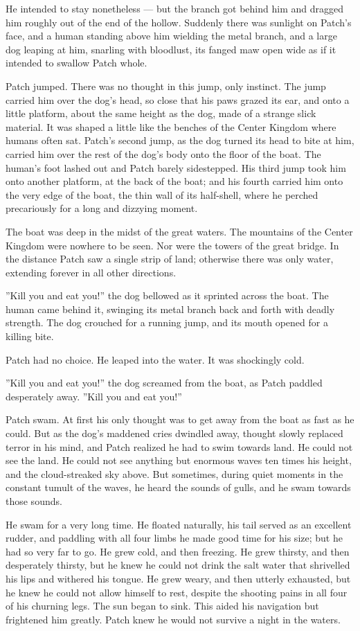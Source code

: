 \documentclass[12pt]{book}
\begin{document}
He intended to stay nonetheless ---
but the branch got behind him and dragged him roughly out of the end of the hollow. Suddenly there was sunlight on Patch's face, and a human standing above him wielding the metal branch, and a large dog leaping at him, snarling with bloodlust, its fanged maw open wide as if it intended to swallow Patch whole.

Patch jumped. There was no thought in this jump, only instinct. The jump carried him over the dog's head, so close that his paws grazed its ear, and onto a little platform, about the same height as the dog, made of a strange slick material. It was shaped a little like the benches of the Center Kingdom where humans often sat. Patch's second jump, as the dog turned its head to bite at him, carried him over the rest of the dog's body onto the floor of the boat. The human's foot lashed out and Patch barely sidestepped. His third jump took him onto another platform, at the back of the boat; and his fourth carried him onto the very edge of the boat, the thin wall of its half-shell, where he perched precariously for a long and dizzying moment.

The boat was deep in the midst of the great waters. The mountains of the Center Kingdom were nowhere to be seen. Nor were the towers of the great bridge. In the distance Patch saw a single strip of land; otherwise there was only water, extending forever in all other directions.

''Kill you and eat you!'' the dog bellowed as it sprinted across the boat. The human came behind it, swinging its metal branch back and forth with deadly strength. The dog crouched for a running jump, and its mouth opened for a killing bite.

Patch had no choice. He leaped into the water. It was shockingly cold.

''Kill you and eat you!'' the dog screamed from the boat, as Patch paddled desperately away. ''Kill you and eat you!''

Patch swam. At first his only thought was to get away from the boat as fast as he could. But as the dog's maddened cries dwindled away, thought slowly replaced terror in his mind, and Patch realized he had to swim towards land. He could not see the land. He could not see anything but enormous waves ten times his height, and the cloud-streaked sky above. But sometimes, during quiet moments in the constant tumult of the waves, he heard the sounds of gulls, and he swam towards those sounds.

He swam for a very long time. He floated naturally, his tail served as an excellent rudder, and paddling with all four limbs he made good time for his size; but he had so very far to go. He grew cold, and then freezing. He grew thirsty, and then desperately thirsty, but he knew he could not drink the salt water that shrivelled his lips and withered his tongue. He grew weary, and then utterly exhausted, but he knew he could not allow himself to rest, despite the shooting pains in all four of his churning legs. The sun began to sink. This aided his navigation but frightened him greatly. Patch knew he would not survive a night in the waters.
\end{document}
